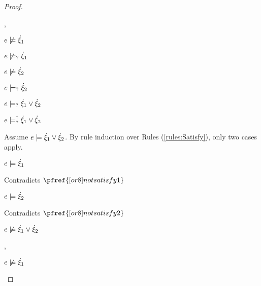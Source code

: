 \begin{proof}
\begin{byCases}
\begin{byCases}
    \item[\cnotsatisfyormay{e}{\hxi_1},\cmaysatisfy{e}{\hxi_2}]
        \begin{pfsteps*}
        \item $e \not\models \dot{\xi}_1$  
        \item $e \not\models_{?} \dot{\xi}_1$  
        \item $e \not\models \dot{\xi}_2$  
        \item $e \models_{?} \dot{\xi}_2$  
        \item $e \models_{?} \dot{\xi}_1 \vee \dot{\xi}_2$  
        \item $e \models_{?}^{\dag} \dot{\xi}_1 \vee \dot{\xi}_2$ 
        \end{pfsteps*}
        Assume $e \models \dot{\xi}_1 \vee \dot{\xi}_2$. By rule induction over Rules (\ref{rules:Satisfy}), only two cases apply.
        \begin{byCases}
        \item[\text{(\ref{rule:CSOr1})}]
            \begin{pfsteps*}
            \item $e \models \dot{\xi}_1$ 
            \end{pfsteps*}
            Contradicts $\pfref{[or8]notsatisfy1}$
        \item[\text{(\ref{rule:CSOr2})}]
            \begin{pfsteps*}
            \item $e \models \dot{\xi}_2$ 
            \end{pfsteps*}
            Contradicts $\pfref{[or8]notsatisfy2}$
        \end{byCases}
        \begin{pfsteps*}
        \item $e \not\models \dot{\xi}_1 \vee \dot{\xi}_2$ 
        \end{pfsteps*}
    \item[\cnotsatisfyormay{e}{\hxi_1},\cnotsatisfyormay{e}{\hxi_2}]
        \begin{pfsteps*}
        \item $e \not\models \dot{\xi}_1$  

\end{pfsteps*}
\end{byCases}
\end{byCases}
\end{proof}
